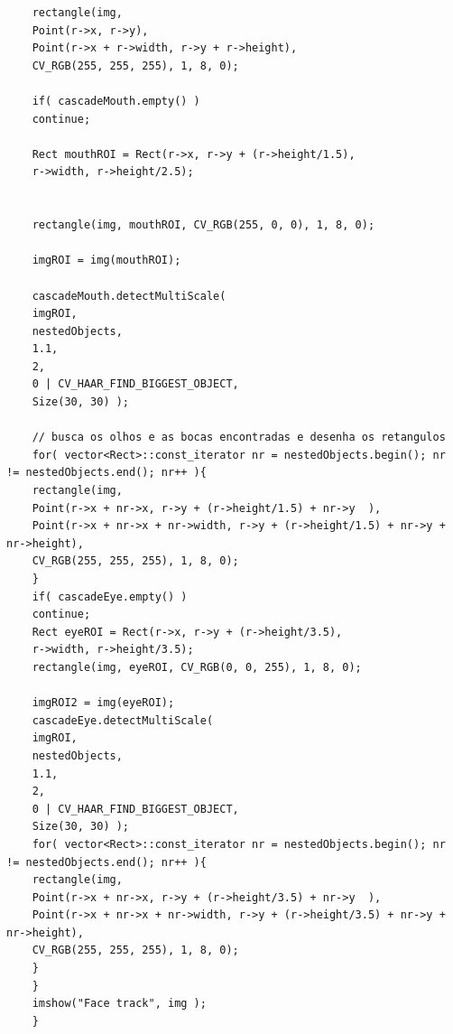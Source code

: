 \documentclass{article}
\begin{document}
\begin{lstlisting}
	rectangle(img,  
	Point(r->x, r->y),
	Point(r->x + r->width, r->y + r->height),  
	CV_RGB(255, 255, 255), 1, 8, 0);
	
	if( cascadeMouth.empty() )
	continue;
	
	Rect mouthROI = Rect(r->x, r->y + (r->height/1.5), 
	r->width, r->height/2.5);
	
	
	rectangle(img, mouthROI, CV_RGB(255, 0, 0), 1, 8, 0);
	
	imgROI = img(mouthROI);
	
	cascadeMouth.detectMultiScale(
	imgROI,
	nestedObjects,
	1.1,
	2,
	0 | CV_HAAR_FIND_BIGGEST_OBJECT,
	Size(30, 30) );
	
	// busca os olhos e as bocas encontradas e desenha os retangulos
	for( vector<Rect>::const_iterator nr = nestedObjects.begin(); nr != nestedObjects.end(); nr++ ){
	rectangle(img,  
	Point(r->x + nr->x, r->y + (r->height/1.5) + nr->y  ),  
	Point(r->x + nr->x + nr->width, r->y + (r->height/1.5) + nr->y + nr->height),
	CV_RGB(255, 255, 255), 1, 8, 0);
	}
	if( cascadeEye.empty() )
	continue;
	Rect eyeROI = Rect(r->x, r->y + (r->height/3.5), 
	r->width, r->height/3.5);
	rectangle(img, eyeROI, CV_RGB(0, 0, 255), 1, 8, 0);
	
	imgROI2 = img(eyeROI);
	cascadeEye.detectMultiScale(
	imgROI,
	nestedObjects,
	1.1,
	2,
	0 | CV_HAAR_FIND_BIGGEST_OBJECT,
	Size(30, 30) );
	for( vector<Rect>::const_iterator nr = nestedObjects.begin(); nr != nestedObjects.end(); nr++ ){
	rectangle(img,  
	Point(r->x + nr->x, r->y + (r->height/3.5) + nr->y  ),  
	Point(r->x + nr->x + nr->width, r->y + (r->height/3.5) + nr->y + nr->height),  
	CV_RGB(255, 255, 255), 1, 8, 0);
	}
	}
	imshow("Face track", img );
	}
	\end{lstlisting}

	
	\newpage
\end{document}
